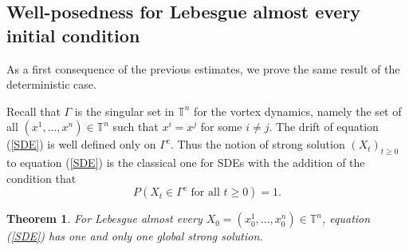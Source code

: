 \documentclass[11pt,a4paper]{article}%
\newtheorem{theorem}{Theorem}
\begin{document}
\subsection{Well-posedness for Lebesgue almost every initial condition}

As a first consequence of the previous estimates, we prove the same result of
the deterministic case.

Recall that $\Gamma$ is the singular set in ${\mathbb{T}}^{n}$ for the vortex
dynamics, namely the set of all $( x^{1},...,x^{n}) \in{\mathbb{T}}^{n}$ such
that $x^{i}=x^{j}$ for some $i\neq j$. The drift of equation (\ref{SDE}) is
well defined only on $\Gamma^{c}$. Thus the notion of strong solution $(
X_{t}) _{t\geq0}$ to equation (\ref{SDE}) is the classical one for SDEs with
the addition of the condition that%
\[
P( X_{t}\in\Gamma^{c}\text{ for all }t\geq0) =1.
\]


\begin{theorem}
\label{teo 1}For Lebesgue almost every $X_{0}=( x_{0}^{1},...,x_{0}^{n})
\in{\mathbb{T}}^{n}$, equation (\ref{SDE}) has one and only one global strong solution.
\end{theorem}
\end{document}
